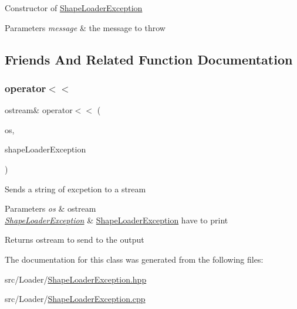 Constructor of \hyperlink{class_shape_loader_exception}{Shape\+Loader\+Exception} 
\begin{DoxyParams}{Parameters}
{\em message} & the message to throw \\
\hline
\end{DoxyParams}


\subsection{Friends And Related Function Documentation}
\hypertarget{class_shape_loader_exception_aaeb686a05fcc919d9b383b9f61182f44}{}\label{class_shape_loader_exception_aaeb686a05fcc919d9b383b9f61182f44} 
\subsubsection{\texorpdfstring{operator$<$$<$}{operator<<}}
{\footnotesize\ttfamily ostream\& operator$<$$<$ (\begin{DoxyParamCaption}\item[{ostream \&}]{os,  }\item[{const \hyperlink{class_shape_loader_exception}{Shape\+Loader\+Exception} \&}]{shape\+Loader\+Exception }\end{DoxyParamCaption})\hspace{0.3cm}{\ttfamily [friend]}}

Sends a string of excpetion to a stream 
\begin{DoxyParams}{Parameters}
{\em os} & ostream \\
\hline
{\em \hyperlink{class_shape_loader_exception}{Shape\+Loader\+Exception}} & \hyperlink{class_shape_loader_exception}{Shape\+Loader\+Exception} have to print \\
\hline
\end{DoxyParams}
\begin{DoxyReturn}{Returns}
ostream to send to the output 
\end{DoxyReturn}


The documentation for this class was generated from the following files\+:\begin{DoxyCompactItemize}
\item 
src/\+Loader/\hyperlink{_shape_loader_exception_8hpp}{Shape\+Loader\+Exception.\+hpp}\item 
src/\+Loader/\hyperlink{_shape_loader_exception_8cpp}{Shape\+Loader\+Exception.\+cpp}\end{DoxyCompactItemize}

